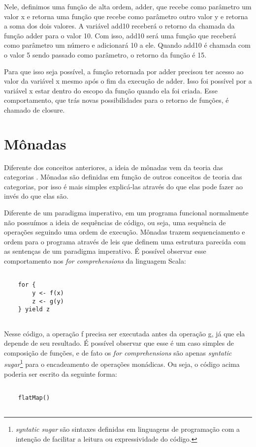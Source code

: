 Nele, definimos uma função de alta ordem, adder, que 
recebe como parâmetro um valor x e retorna uma função 
que recebe como parâmetro outro valor y e retorna a 
soma dos dois valores. A variável add10 receberá 
o retorno da chamada da função adder para o valor 10. 
Com isso, add10 será uma função que receberá como 
parâmetro um número e adicionará 10 a ele. Quando 
add10 é chamada com o valor 5 sendo passado como 
parâmetro, o retorno da função é 15.

Para que isso seja possível, a função retornada por 
adder precisou ter acesso ao valor da variável x mesmo 
após o fim da execução de adder. Isso foi possível 
por a variável x estar dentro do escopo da função 
quando ela foi criada. Esse comportamento, que trás 
novas possibilidades para o retorno de funções, 
é chamado de closure\cite{mflambdas}.


\section{Mônadas}

Diferente dos conceitos anteriores, a ideia de 
mônadas 
vem da teoria das categorias \cite{functionalscala}. 
Mônadas são definidas em função de outros conceitos de 
teoria das categorias, por isso é mais simples explicá-las 
através do que elas pode fazer ao invés do que elas são. 

Diferente de um paradigma imperativo, em um programa 
funcional normalmente não possuímos a ideia de 
sequências de código, ou seja, uma sequência de 
operações seguindo uma ordem de execução. Mônadas 
trazem sequenciamento e ordem para o programa através 
de leis que definem uma estrutura parecida com as 
sentenças de um paradigma imperativo\cite{camargomonads}.
É possível observar esse comportamento nos \textit{for 
comprehensions} da linguagem Scala\cite{functionalscala}:

\begin{lstlisting}[caption={Exemplo de notação for},label=foropscala]

    for {
        y <- f(x)
        z <- g(y)
    } yield z
    

\end{lstlisting}

Nesse código, a operação f precisa ser executada 
antes da operação g, já que ela depende de seu 
resultado. É possível observar que esse é um caso 
simples de composição de funções, e de fato os 
\textit{for comprehensions} são apenas \textit{syntatic 
sugar}\footnote{\textit{syntatic sugar} são sintaxes 
definidas em linguagens de programação com a intenção 
de facilitar a leitura ou expressividade do código.} 
para o encadeamento de operações monádicas\cite{yieldscala}. 
Ou seja, o código acima poderia ser escrito 
da seguinte forma:

\begin{lstlisting}[caption={Exemplo de fmap},label=fmapscala]

    flatMap()
    

\end{lstlisting}